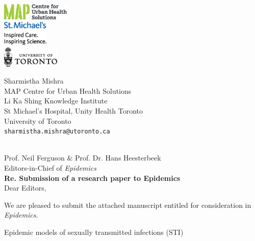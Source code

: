 \documentclass[a4]{article}
\begin{document}
\begin{minipage}{0.5\linewidth}
  \includegraphics[height=0.8cm]{map-cuhs.eps}\\[1em]
  \includegraphics[height=1.2cm]{smh.eps}\\[1em]
  \includegraphics[height=1cm]{uoft.eps}
\end{minipage}%
\begin{minipage}{0.5\linewidth}
  \begin{flushright}
    Sharmistha Mishra\\
    MAP Centre for Urban Health Solutions\\
    Li Ka Shing Knowledge Institute\\
    St Michael's Hospital,
    Unity Health Toronto\\
    University of Toronto\\
    \texttt{sharmistha.mishra@utoronto.ca}
  \end{flushright}
\end{minipage}
\\[2em]
Prof. Neil Ferguson \& Prof. Dr. Hans Heesterbeek\\
Editors-in-Chief of \textit{Epidemics}\\[1em]
\textbf{Re. Submission of a research paper to Epidemics}\\[1em]
Dear Editors,
\par
We are pleased to submit the attached manuscript entitled
\textit{}%
for consideration in  \textit{Epidemics}.							%
\par
Epidemic models of sexually transmitted infections (STI)
\end{document}
